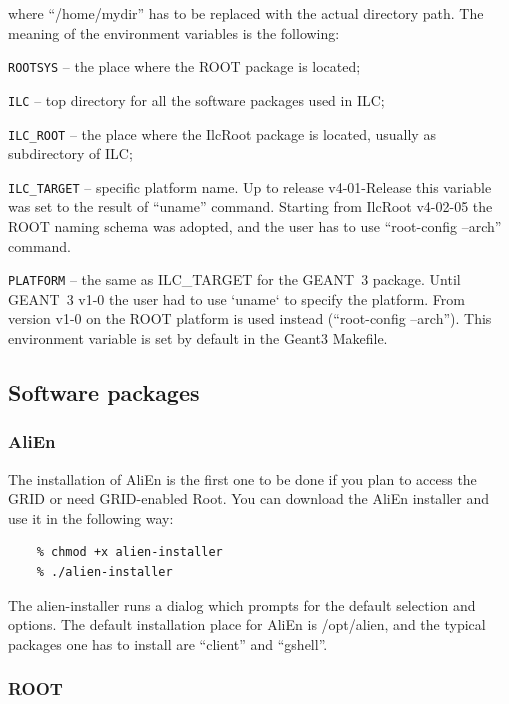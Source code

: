 \documentclass[12pt,a4paper,twoside]{article}
\begin{document}
where ``/home/mydir'' has to be replaced with the actual directory
path. The meaning of the environment variables is the following:

\texttt{ROOTSYS} -- the place where the ROOT package is located;

\texttt{ILC} -- top directory for all the software packages used in ILC;

\texttt{ILC\_ROOT} -- the place where the IlcRoot package is located, usually
as subdirectory of ILC;

\texttt{ILC\_TARGET} -- specific platform name. Up to release
v4-01-Release this variable was set to the result of ``uname''
command. Starting from IlcRoot v4-02-05 the ROOT naming schema was
adopted, and the user has to use ``root-config --arch'' command.

\texttt{PLATFORM} -- the same as ILC\_TARGET for the GEANT~3
package. Until GEANT~3 v1-0 the user had to use `uname` to specify the
platform. From version v1-0 on the ROOT platform is used instead
(``root-config --arch''). This environment variable is set by default
in the Geant3 Makefile.



\subsection{Software packages}

\subsubsection{AliEn}

The installation of AliEn is the first one to be done if you plan to
access the GRID or need GRID-enabled Root. You can download the AliEn
installer and use it in the following way:
  \begin{lstlisting}[language=sh, title={AliEn installation}]
    % wget http://alien.cern.ch/alien-installer
    % chmod +x alien-installer
    % ./alien-installer
  \end{lstlisting}
The alien-installer runs a dialog which prompts for the default
selection and options. The default installation place for AliEn is
/opt/alien, and the typical packages one has to install are ``client''
and ``gshell''.

\subsubsection{ROOT}
\end{document}
